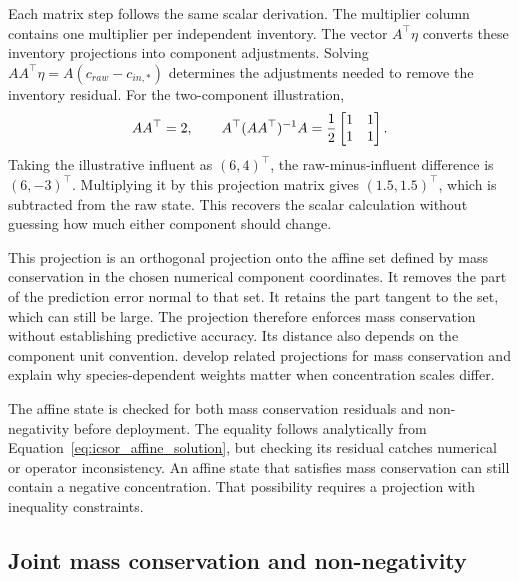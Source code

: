 Each matrix step follows the same scalar derivation. The multiplier column contains one multiplier per independent inventory. The vector \(A^\top\eta\) converts these inventory projections into component adjustments. Solving \(AA^\top\eta=A(c_{raw}-c_{in,*})\) determines the adjustments needed to remove the inventory residual. For the two-component illustration,
\begin{equation}
\equationname{Illustrative matrix of the mass conservation projection}
\label{eq:icsor_small_affine_matrix}
AA^\top=2,
\qquad
A^\top(AA^\top)^{-1}A
=\frac{1}{2}\begin{bmatrix}1&1\\1&1\end{bmatrix}.
\end{equation}
Taking the illustrative influent as \((6,4)^\top\), the raw-minus-influent difference is \((6,-3)^\top\). Multiplying it by this projection matrix gives \((1.5,1.5)^\top\), which is subtracted from the raw state. This recovers the scalar calculation without guessing how much either component should change.

This projection is an orthogonal projection onto the affine set defined by mass conservation in the chosen numerical component coordinates. It removes the part of the prediction error normal to that set. It retains the part tangent to the set, which can still be large. The projection therefore enforces mass conservation without establishing predictive accuracy. Its distance also depends on the component unit convention. \citet{SturmSilva2024} develop related projections for mass conservation and explain why species-dependent weights matter when concentration scales differ.

The affine state is checked for both mass conservation residuals and non-negativity before deployment. The equality follows analytically from Equation~\eqref{eq:icsor_affine_solution}, but checking its residual catches numerical or operator inconsistency. An affine state that satisfies mass conservation can still contain a negative concentration. That possibility requires a projection with inequality constraints.

\subsection{Joint mass conservation and non-negativity}

